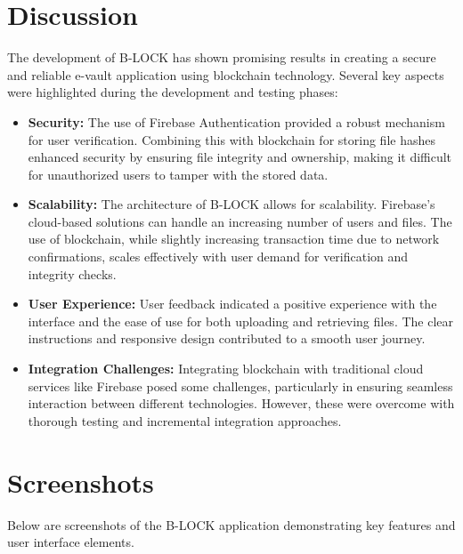 \documentclass[12pt,a4paper]{report}
\begin{document}
\section{Discussion}
The development of B-LOCK has shown promising results in creating a secure and reliable e-vault application using blockchain technology. Several key aspects were highlighted during the development and testing phases:
\begin{itemize}
   \item \textbf{Security:} The use of Firebase Authentication provided a robust mechanism for user verification. Combining this with blockchain for storing file hashes enhanced security by ensuring file integrity and ownership, making it difficult for unauthorized users to tamper with the stored data.
   \item \textbf{Scalability:} The architecture of B-LOCK allows for scalability. Firebase’s cloud-based solutions can handle an increasing number of users and files. The use of blockchain, while slightly increasing transaction time due to network confirmations, scales effectively with user demand for verification and integrity checks.
   \item \textbf{User Experience:} User feedback indicated a positive experience with the interface and the ease of use for both uploading and retrieving files. The clear instructions and responsive design contributed to a smooth user journey.
   \item \textbf{Integration Challenges:} Integrating blockchain with traditional cloud services like Firebase posed some challenges, particularly in ensuring seamless interaction between different technologies. However, these were overcome with thorough testing and incremental integration approaches.
\end{itemize}

\section{Screenshots}
Below are screenshots of the B-LOCK application demonstrating key features and user interface elements.
\end{document}
